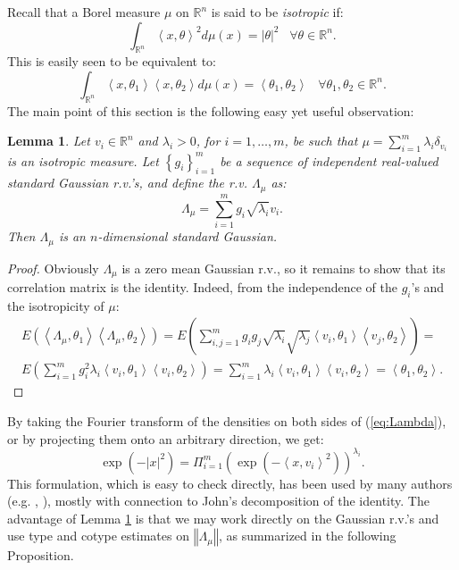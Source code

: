 \documentclass[12pt,oneside]{amsart}
\newtheorem{lem}[thm]{Lemma}
\theoremstyle{definition}
\theoremstyle{remark}
\theoremstyle{proof}
\numberwithin{equation}{section}
\newcommand{\norm}[1]{\left\Vert#1\right\Vert}
\newcommand{\abs}[1]{\left\vert#1\right\vert}
\newcommand{\set}[1]{\left\{#1\right\}}
\newcommand{\brac}[1]{\left(#1\right)}
\newcommand{\scalar}[1]{\left \langle #1 \right \rangle}
\newcommand{\Real}{\mathbb{R}}
\begin{document}
Recall that a Borel measure $\mu$ on $\Real^n$ is said to be
\emph{isotropic} if:
\[
\int_{\Real^n} \scalar{x,\theta}^2 d\mu(x) = \abs{\theta}^2
\;\;\; \forall \theta \in \Real^n.
\]
This is easily seen to be equivalent to:
\[
\int_{\Real^n} \scalar{x,\theta_1} \scalar{x,\theta_2} d\mu(x) =
\scalar{\theta_1,\theta_2} \;\;\; \forall \theta_1,\theta_2 \in
\Real^n.
\]
The main point of this section is the following easy yet useful
observation:
\begin{lem} \label{lem:isotropic_is_gaussian}
Let $v_i \in \Real^n$ and $\lambda_i > 0$, for $i=1,\ldots,m$, be
such that $\mu = \sum_{i=1}^m \lambda_i \delta_{v_i}$ is an
isotropic measure. Let $\set{g_i}_{i=1}^m$ be a sequence of
independent real-valued standard Gaussian r.v.'s, and define the
r.v. $\Lambda_\mu$ as:
\begin{equation} \label{eq:Lambda}
\Lambda_\mu = \sum_{i=1}^m g_i \sqrt{\lambda_i} v_i.
\end{equation}
Then $\Lambda_\mu$ is an $n$-dimensional standard Gaussian.
\end{lem}
\begin{proof}
Obviously $\Lambda_\mu$ is a zero mean Gaussian r.v., so it
remains to show that its correlation matrix is the identity.
Indeed, from the independence of the $g_i$'s and the isotropicity
of $\mu$:
\begin{eqnarray}
\nonumber E\brac{\scalar{\Lambda_\mu,\theta_1}
\scalar{\Lambda_\mu,\theta_2}} = E \brac{ \sum_{i,j=1}^m g_i g_j
\sqrt{\lambda_i} \sqrt{\lambda_j}  \scalar{v_i,\theta_1}
\scalar{v_j,\theta_2} } = \\
\nonumber E \brac{ \sum_{i=1}^m g_i^2 \lambda_i
\scalar{v_i,\theta_1} \scalar{v_i,\theta_2} } = \sum_{i=1}^m
\lambda_i \scalar{v_i,\theta_1} \scalar{v_i,\theta_2} =
\scalar{\theta_1,\theta_2}.
\end{eqnarray}
\end{proof}

By taking the Fourier transform of the densities on both sides of
(\ref{eq:Lambda}), or by projecting them onto an arbitrary
direction, we get:
\[
\exp(-\abs{x}^2) = \Pi_{i=1}^m
\brac{\exp(-\scalar{x,v_i}^2)}^{\lambda_i}.
\]
This formulation, which is easy to check directly, has been used
by many authors %
(e.g. \cite{Schechtman-Schlumprecht}, \cite{BallUseBrascampLieb}),
mostly with connection to John's decomposition of the identity.
The advantage of Lemma \ref{lem:isotropic_is_gaussian} is that we
may work directly on the Gaussian r.v.'s and use type and cotype
estimates on $\norm{\Lambda_\mu}$, as summarized in the following
Proposition.
\end{document}
